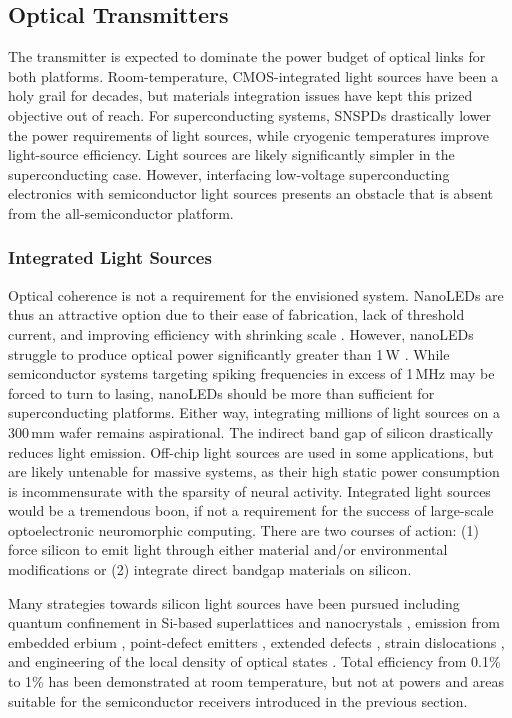 \documentclass[twocolumn]{article}
\begin{document}
\subsection{Optical Transmitters}
The transmitter is expected to dominate the power budget of optical links for both platforms. Room-temperature, CMOS-integrated light sources have been a holy grail for decades, but materials integration issues have kept this prized objective out of reach. For superconducting systems, SNSPDs drastically lower the power requirements of light sources, while cryogenic temperatures improve light-source efficiency. Light sources are likely significantly simpler in the superconducting case. However, interfacing low-voltage superconducting electronics with semiconductor light sources \cite{mccaughan2019superconducting} presents an obstacle that is absent from the all-semiconductor platform.

\subsubsection{Integrated Light Sources}
Optical coherence is not a requirement for the envisioned system. NanoLEDs are thus an attractive option due to their ease of fabrication, lack of threshold current, and improving efficiency with shrinking scale \cite{romeira2019physical}. However, nanoLEDs struggle to produce optical power significantly greater than 1\,\textmu W \cite{romeira2019physical}. While semiconductor systems targeting spiking frequencies in excess of 1\,MHz may be forced to turn to lasing, nanoLEDs should be more than sufficient for superconducting platforms. Either way, integrating millions of light sources on a 300\,mm wafer remains aspirational. The indirect band gap of silicon drastically reduces light emission. Off-chip light sources are used in some applications, but are likely untenable for massive systems, as their high static power consumption is incommensurate with the sparsity of neural activity. Integrated light sources would be a tremendous boon, if not a requirement for the success of large-scale optoelectronic neuromorphic computing. There are two courses of action: (1) force silicon to emit light through either material and/or environmental modifications or (2) integrate direct bandgap materials on silicon. 

Many strategies towards silicon light sources have been pursued \cite{iyxi1993,shxu2007} including quantum confinement in Si-based superlattices \cite{warga2008electroluminescence} and nanocrystals \cite{wabo2005}, emission from embedded erbium \cite{enpo1985,paga1996}, point-defect emitters \cite{brha1986,brbr1989,rosh2007b,bata2007}, extended defects \cite{ng2001efficient}, strain dislocations \cite{kvba2004}, and engineering of the local density of optical states \cite{grzh2001}. Total efficiency from 0.1\% \cite{kvba2004} to 1\% \cite{grzh2001} has been demonstrated at room temperature, but not at powers and areas suitable for the semiconductor receivers introduced in the previous section.
\end{document}
